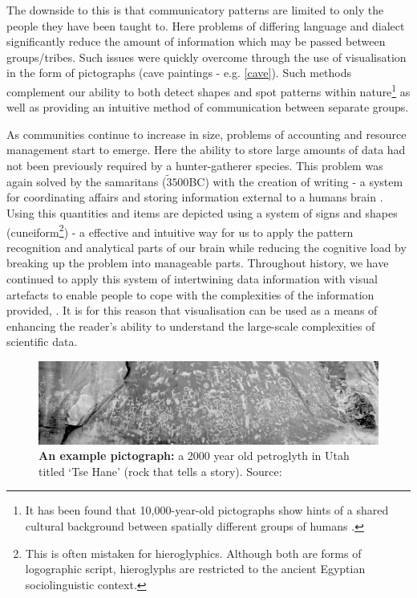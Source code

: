 The downside to this is that communicatory patterns are limited to only the people they have been taught to. Here problems of differing language and dialect significantly reduce the amount of information which may be passed between groups/tribes. Such issues were quickly overcome through the use of visualisation in the form of pictographs (cave paintings - e.g. \autoref{cave}). Such methods complement our ability to both detect shapes and spot patterns within nature\footnote{It has been found that 10,000-year-old pictographs show hints of a shared cultural background between spatially different groups of humans \citep{cave}.} as well as providing an intuitive method of communication between separate groups.


As communities continue to increase in size, problems of accounting and resource management start to emerge. Here the ability to store large amounts of data had not been previously required by a hunter-gatherer species. This problem was again solved by the samaritans ($\tilde 3500$BC) with the creation of writing - a system for coordinating affairs and storing information external to a humans brain \citep{archaic,beforeCuneiform}. Using this quantities and items are depicted using a system of signs and shapes (cuneiform\footnote{This is often mistaken for hieroglyphics. Although both are forms of logographic script, hieroglyphs are restricted to the ancient Egyptian sociolinguistic context. }) - a effective and intuitive way for us to apply the pattern recognition and analytical parts of our brain while reducing the cognitive load by breaking up the problem into manageable parts.
Throughout history, we have continued to apply this system of intertwining data information with visual artefacts to enable people to cope with the complexities of the information provided, \citep{tufte}. It is for this reason that visualisation can be used as a means of enhancing the reader's ability to understand the large-scale complexities of scientific data.


\begin{figure}[H]
         \centering
         \includegraphics[width=\textwidth]{figures_c1/newspaperrock.jpg}
        \caption{\textbf{An example pictograph:} a 2000 year old petroglyth in Utah titled `Tse Hane' (rock that tells a story). Source:
        \citep{newspaperrock} }
        \label{cave}
\end{figure}


